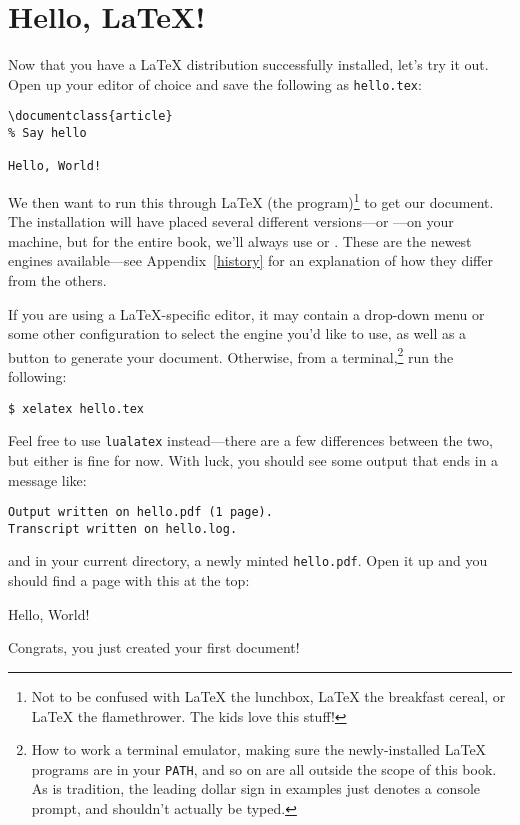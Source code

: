 \chapter{Hello, \texorpdfstring{\LaTeX}{LaTeX}!}

Now that you have a \LaTeX{} distribution successfully installed,
let's try it out.
Open up your editor of choice and save the following as \texttt{hello.tex}:
\begin{leftfigure}
\begin{lstlisting}
\documentclass{article}
% Say hello

Hello, World!

\end{lstlisting}
\end{leftfigure}
We then want to run this through \LaTeX{} (the program)\footnote{Not to be
confused with \LaTeX{} the lunchbox, \LaTeX{} the breakfast cereal,
or \LaTeX{} the flamethrower. The kids love this stuff!}
to get our document.
The installation will have placed several different versions---or
---on your machine,
but for the entire book, we'll always use \LuaLaTeX or \XeLaTeX.
These are the newest engines available---see Appendix~\ref{history} for an
explanation of how they differ from the others.

If you are using a \LaTeX{}-specific editor, it may contain a drop-down menu
or some other configuration to select the engine you'd like to use,
as well as a button to generate your document.
Otherwise, from a terminal,\punckern\footnote{How to work a terminal emulator,
making sure the newly-installed \LaTeX{} programs are in your \texttt{PATH},
and so on are all outside the scope of this book.
As is tradition, the leading dollar sign in examples just denotes a console
prompt, and shouldn't actually be typed.}
run the following:
\begin{leftfigure}
\begin{lstlisting}
$ xelatex hello.tex
\end{lstlisting}
\end{leftfigure}
Feel free to use \texttt{lualatex} instead---there are a few differences
between the two, but either is fine for now.
With luck, you should see some output that ends in a message like:
\begin{leftfigure}
\begin{lstlisting}
Output written on hello.pdf (1 page).
Transcript written on hello.log.
\end{lstlisting}
\end{leftfigure}
and in your current directory, a newly minted \texttt{hello.pdf}.
Open it up and you should find a page with this at the top:
\begin{leftfigure}
\lm Hello, World!
\end{leftfigure}
Congrats,
you just created your first document!

